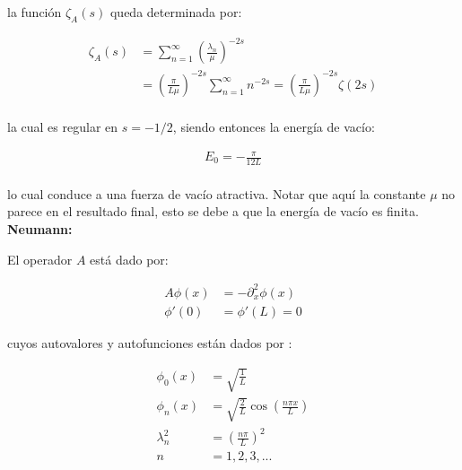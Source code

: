 la función $\zeta _A (s)$ queda determinada por:

\begin{equation}
\begin{aligned}
\zeta _A (s) &= 
\sum _{n=1} ^{\infty} \left( \frac{\lambda _n}{\mu} \right) ^{-2s}  \\[10pt]
&= \left(  \frac{\pi}{L \mu} \right) ^{-2s}   \sum _{n=1} ^{\infty} n ^{-2s} = 
\left( \frac{\pi}{L \mu} \right) ^{-2s}  \zeta (2s) \\[10pt]
\end{aligned}
\end{equation}


la cual es regular en $s=-1/2$, siendo entonces la energía de vacío:

\begin{equation}
\begin{array}{c}
E _0 = - \frac{\pi}{12 L} \\[8pt]
\end{array}
\end{equation}

lo cual conduce a una fuerza de vacío atractiva. Notar que aquí la constante $\mu$ no parece en el resultado final, esto se debe a que la energía de vacío es finita.\\

\textbf{Neumann:}

El operador $A$ está dado por:

\begin{equation}
\begin{aligned}
	A \phi (x) &= - \partial _x ^2 \phi (x) \\[10pt]
    \phi ' (0) &= \phi ' (L) = 0 
\end{aligned}
\end{equation}



cuyos autovalores y autofunciones están dados por  : 

\begin{equation}
\begin{aligned}
	\phi _0 (x) &= \sqrt{ \frac{1}{L} } \\[5pt]
	\phi _n (x)  &= \sqrt{\frac{2}{L}} \cos \left( \frac{n \pi x}{L} \right) \\[5pt]
	\lambda _n ^2 &= \left( \frac{n \pi }{L} \right) ^2 \\[5pt]
	n &= 1,2,3, ...
\end{aligned}
\end{equation}



